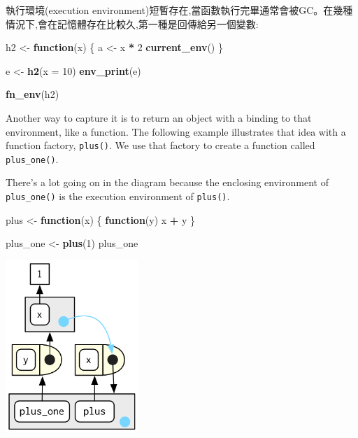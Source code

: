 \documentclass[]{book}
\newenvironment{Shaded}{\begin{snugshade}}{\end{snugshade}}
\newcommand{\ControlFlowTok}[1]{\textcolor[rgb]{0.13,0.29,0.53}{\textbf{#1}}}
\newcommand{\DataTypeTok}[1]{\textcolor[rgb]{0.13,0.29,0.53}{#1}}
\newcommand{\DecValTok}[1]{\textcolor[rgb]{0.00,0.00,0.81}{#1}}
\newcommand{\KeywordTok}[1]{\textcolor[rgb]{0.13,0.29,0.53}{\textbf{#1}}}
\newcommand{\NormalTok}[1]{#1}
\newcommand{\OperatorTok}[1]{\textcolor[rgb]{0.81,0.36,0.00}{\textbf{#1}}}
\newcommand{\StringTok}[1]{\textcolor[rgb]{0.31,0.60,0.02}{#1}}
\theoremstyle{definition}
\theoremstyle{definition}
\theoremstyle{definition}
\theoremstyle{remark}
\begin{document}
執行環境(execution
environment)短暫存在,當函數執行完畢通常會被GC。在幾種情況下,會在記憶體存在比較久,第一種是回傳給另一個變數:

\begin{Shaded}
\begin{Highlighting}[]
\NormalTok{h2 <-}\StringTok{ }\ControlFlowTok{function}\NormalTok{(x) \{}
\NormalTok{  a <-}\StringTok{ }\NormalTok{x }\OperatorTok{*}\StringTok{ }\DecValTok{2}
  \KeywordTok{current_env}\NormalTok{()}
\NormalTok{\}}

\NormalTok{e <-}\StringTok{ }\KeywordTok{h2}\NormalTok{(}\DataTypeTok{x =} \DecValTok{10}\NormalTok{)}
\KeywordTok{env_print}\NormalTok{(e)}
\end{Highlighting}
\end{Shaded}

\begin{Shaded}
\begin{Highlighting}[]
\KeywordTok{fn_env}\NormalTok{(h2)}
\end{Highlighting}
\end{Shaded}

Another way to capture it is to return an object with a binding to that
environment, like a function. The following example illustrates that
idea with a function factory, \texttt{plus()}. We use that factory to
create a function called \texttt{plus\_one()}.

There's a lot going on in the diagram because the enclosing environment
of \texttt{plus\_one()} is the execution environment of \texttt{plus()}.

\begin{Shaded}
\begin{Highlighting}[]
\NormalTok{plus <-}\StringTok{ }\ControlFlowTok{function}\NormalTok{(x) \{}
  \ControlFlowTok{function}\NormalTok{(y) x }\OperatorTok{+}\StringTok{ }\NormalTok{y}
\NormalTok{\}}

\NormalTok{plus_one <-}\StringTok{ }\KeywordTok{plus}\NormalTok{(}\DecValTok{1}\NormalTok{)}
\NormalTok{plus_one}
\end{Highlighting}
\end{Shaded}

\begin{center}\includegraphics[width=1.97in]{diagrams/environments/closure} \end{center}
\end{document}
